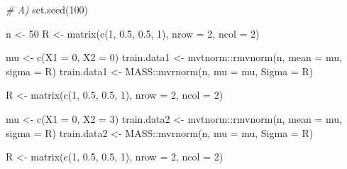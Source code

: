 \documentclass[
]{article}
\newenvironment{Shaded}{\begin{snugshade}}{\end{snugshade}}
\newcommand{\AttributeTok}[1]{\textcolor[rgb]{0.77,0.63,0.00}{#1}}
\newcommand{\CommentTok}[1]{\textcolor[rgb]{0.56,0.35,0.01}{\textit{#1}}}
\newcommand{\DecValTok}[1]{\textcolor[rgb]{0.00,0.00,0.81}{#1}}
\newcommand{\FloatTok}[1]{\textcolor[rgb]{0.00,0.00,0.81}{#1}}
\newcommand{\FunctionTok}[1]{\textcolor[rgb]{0.00,0.00,0.00}{#1}}
\newcommand{\NormalTok}[1]{#1}
\newcommand{\OtherTok}[1]{\textcolor[rgb]{0.56,0.35,0.01}{#1}}
\newcommand{\SpecialCharTok}[1]{\textcolor[rgb]{0.00,0.00,0.00}{#1}}
\begin{document}
\begin{Shaded}
\begin{Highlighting}[]
\CommentTok{\# A)}
\FunctionTok{set.seed}\NormalTok{(}\DecValTok{100}\NormalTok{)}

\NormalTok{n }\OtherTok{\textless{}{-}} \DecValTok{50}
\NormalTok{R }\OtherTok{\textless{}{-}} \FunctionTok{matrix}\NormalTok{(}\FunctionTok{c}\NormalTok{(}\DecValTok{1}\NormalTok{, }\FloatTok{0.5}\NormalTok{,}
              \FloatTok{0.5}\NormalTok{, }\DecValTok{1}\NormalTok{), }
            \AttributeTok{nrow =} \DecValTok{2}\NormalTok{, }\AttributeTok{ncol =} \DecValTok{2}\NormalTok{)}

\NormalTok{mu }\OtherTok{\textless{}{-}} \FunctionTok{c}\NormalTok{(}\AttributeTok{X1 =} \DecValTok{0}\NormalTok{, }\AttributeTok{X2 =} \DecValTok{0}\NormalTok{)}
\NormalTok{train.data1 }\OtherTok{\textless{}{-}}\NormalTok{ mvtnorm}\SpecialCharTok{::}\FunctionTok{rmvnorm}\NormalTok{(n, }\AttributeTok{mean =}\NormalTok{ mu, }\AttributeTok{sigma =}\NormalTok{ R)}
\NormalTok{train.data1 }\OtherTok{\textless{}{-}}\NormalTok{ MASS}\SpecialCharTok{::}\FunctionTok{mvrnorm}\NormalTok{(n, }\AttributeTok{mu =}\NormalTok{ mu, }\AttributeTok{Sigma =}\NormalTok{ R)}


\NormalTok{R }\OtherTok{\textless{}{-}} \FunctionTok{matrix}\NormalTok{(}\FunctionTok{c}\NormalTok{(}\DecValTok{1}\NormalTok{, }\FloatTok{0.5}\NormalTok{,}
              \FloatTok{0.5}\NormalTok{, }\DecValTok{1}\NormalTok{), }
            \AttributeTok{nrow =} \DecValTok{2}\NormalTok{, }\AttributeTok{ncol =} \DecValTok{2}\NormalTok{)}

\NormalTok{mu }\OtherTok{\textless{}{-}} \FunctionTok{c}\NormalTok{(}\AttributeTok{X1 =} \DecValTok{0}\NormalTok{, }\AttributeTok{X2 =} \DecValTok{3}\NormalTok{)}
\NormalTok{train.data2 }\OtherTok{\textless{}{-}}\NormalTok{ mvtnorm}\SpecialCharTok{::}\FunctionTok{rmvnorm}\NormalTok{(n, }\AttributeTok{mean =}\NormalTok{ mu, }\AttributeTok{sigma =}\NormalTok{ R)}
\NormalTok{train.data2 }\OtherTok{\textless{}{-}}\NormalTok{ MASS}\SpecialCharTok{::}\FunctionTok{mvrnorm}\NormalTok{(n, }\AttributeTok{mu =}\NormalTok{ mu, }\AttributeTok{Sigma =}\NormalTok{ R)}
                             
\NormalTok{R }\OtherTok{\textless{}{-}} \FunctionTok{matrix}\NormalTok{(}\FunctionTok{c}\NormalTok{(}\DecValTok{1}\NormalTok{, }\FloatTok{0.5}\NormalTok{,}
              \FloatTok{0.5}\NormalTok{, }\DecValTok{1}\NormalTok{), }
            \AttributeTok{nrow =} \DecValTok{2}\NormalTok{, }\AttributeTok{ncol =} \DecValTok{2}\NormalTok{)}


\end{Highlighting}
\end{Shaded}
\end{document}
